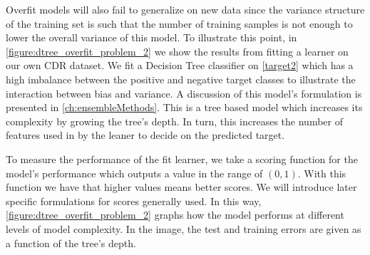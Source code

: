 
Overfit models will also fail to generalize on new data since the variance structure of the training set is such that the number of training samples is not enough to lower the overall variance of this model.
To illustrate this point, in \cref{figure:dtree_overfit_problem_2} we show the results from fitting a learner on our own CDR dataset.
We fit a Decision Tree classifier on \cref{target2} which has a high imbalance between the positive and negative target classes to illustrate the interaction between bias and variance.
A discussion of this model's formulation is presented in \cref{ch:ensembleMethods}.
This is a tree based model which increases its complexity by growing the tree's depth.
In turn, this increases the number of features used in by the leaner to decide on the predicted target.



To measure the performance of the fit learner, we take a scoring function for the model's performance which outputs a value in the range of $(0,1)$. With this function we have that higher values means better scores.
We will introduce later specific formulations for scores generally used.
In this way, \cref{figure:dtree_overfit_problem_2} graphs how the model performs at different levels of model complexity.
In the image, the test and training errors are given as a function of the tree's depth.


